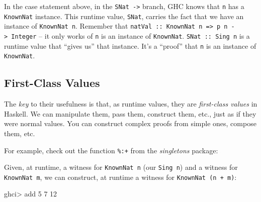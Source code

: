 \documentclass[]{article}
\newenvironment{Shaded}{}{}
\newcommand{\KeywordTok}[1]{\textcolor[rgb]{0.00,0.44,0.13}{\textbf{#1}}}
\newcommand{\DataTypeTok}[1]{\textcolor[rgb]{0.56,0.13,0.00}{#1}}
\newcommand{\DecValTok}[1]{\textcolor[rgb]{0.25,0.63,0.44}{#1}}
\newcommand{\CommentTok}[1]{\textcolor[rgb]{0.38,0.63,0.69}{\textit{#1}}}
\newcommand{\OtherTok}[1]{\textcolor[rgb]{0.00,0.44,0.13}{#1}}
\newcommand{\FunctionTok}[1]{\textcolor[rgb]{0.02,0.16,0.49}{#1}}
\newcommand{\NormalTok}[1]{#1}
\begin{document}
In the case statement above, in the \texttt{SNat\ -\textgreater{}} branch, GHC
knows that \texttt{n} has a \texttt{KnownNat} instance. This runtime value,
\texttt{SNat}, carries the fact that we have an instance of
\texttt{KnownNat\ n}. Remember that
\texttt{natVal\ ::\ KnownNat\ n\ =\textgreater{}\ p\ n\ -\textgreater{}\ Integer}
-- it only works of \texttt{n} is an instance of \texttt{KnownNat}.
\texttt{SNat\ ::\ Sing\ n} is a runtime value that ``gives us'' that instance.
It's a ``proof'' that \texttt{n} is an instance of \texttt{KnownNat}.

\subsection{First-Class Values}\label{first-class-values}

The \emph{key} to their usefulness is that, as runtime values, they are
\emph{first-class values} in Haskell. We can manipulate them, pass them,
construct them, etc., just as if they were normal values. You can construct
complex proofs from simple ones, compose them, etc.

For example, check out the function \texttt{\%:+} from the \emph{singletons}
package:

\begin{Shaded}
\begin{Highlighting}[]
\OtherTok{(%:+) ::}\NormalTok{ forall (}\OtherTok{n ::} \DataTypeTok{Nat}\NormalTok{) (}\OtherTok{m ::} \DataTypeTok{Nat}\NormalTok{)}\FunctionTok{.} \DataTypeTok{Sing}\NormalTok{ n }\OtherTok{->} \DataTypeTok{Sing}\NormalTok{ m }\OtherTok{->} \DataTypeTok{Sing}\NormalTok{ (n }\FunctionTok{+}\NormalTok{ m)}
\end{Highlighting}
\end{Shaded}

Given, at runtime, a witness for \texttt{KnownNat\ n} (our \texttt{Sing\ n}) and
a witness for \texttt{KnownNat\ m}, we can construct, at runtime a witness for
\texttt{KnownNat\ (n\ +\ m)}:

\begin{Shaded}
\end{Shaded}

\begin{Shaded}
\begin{Highlighting}[]
\NormalTok{ghci}\FunctionTok{>}\NormalTok{ add }\DecValTok{5} \DecValTok{7}
\DecValTok{12}
\end{Highlighting}
\end{Shaded}
\end{document}
